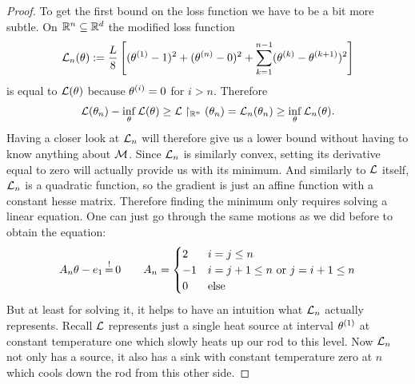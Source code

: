 \begin{proof}
	To get the first bound on the loss function we have to be a bit more subtle.
	On \(\mathbb{R}^n\subseteq \mathbb{R}^d\) the modified loss function
	\begin{align}\label{eq: sink loss}
		\mathcal{L}_n(\theta) := \frac{L}{8}\left[
			(\theta^{(1)} -1)^2
			+ (\theta^{(n)} - 0)^2
			+ \sum_{k=1}^{n-1} (\theta^{(k)} - \theta^{(k+1)})^2
		\right]
	\end{align}
	is equal to \(\mathcal{L}(\theta)\) because \(\theta^{(i)}=0\) for \(i>n\).
	Therefore
	\begin{align*}
		\mathcal{L}(\theta_n) - \inf_{\theta}\mathcal{L}(\theta)
		\ge \mathcal{L}\restriction_{\mathbb{R}^n}(\theta_n) = \mathcal{L}_n(\theta_n)
		\ge \inf_{\theta}\mathcal{L}_n(\theta).
	\end{align*}
	Having a closer look at \(\mathcal{L}_n\) will therefore give us a lower bound
	without having to know anything about \(\mathcal{M}\). Since \(\mathcal{L}_n\)
	is similarly convex, setting its derivative equal to zero will actually provide us
	with its minimum. And similarly to \(\mathcal{L}\) itself, \(\mathcal{L}_n\) is a
	quadratic function, so the gradient is just an affine function with a
	constant hesse matrix. Therefore finding the minimum only requires solving
	a linear equation. One can just go through the same motions as we did
	before to obtain the equation:
	\begin{align}\label{eq: optimality condition for sink loss}
		A_n \weights - \stdBasis_1 \xeq{!} 0 \qquad 
		A_n =\begin{cases}
			2 & i=j\le n \\
			-1 & i=j+1\le n \text{ or } j=i+1\le n \\
			0 & \text{else}
		\end{cases} 
	\end{align}
	But at least for solving it, it helps to have an intuition what \(\mathcal{L}_n\)
	actually represents. Recall \(\mathcal{L}\) represents just
	a single heat source at interval \(\theta^{(1)}\) at constant
	temperature one which slowly heats up our rod to this level. Now
	\(\mathcal{L}_n\) not only has a source, it also has a sink with constant
	temperature zero at \(n\) which cools down the rod from this other side.


\end{proof}

